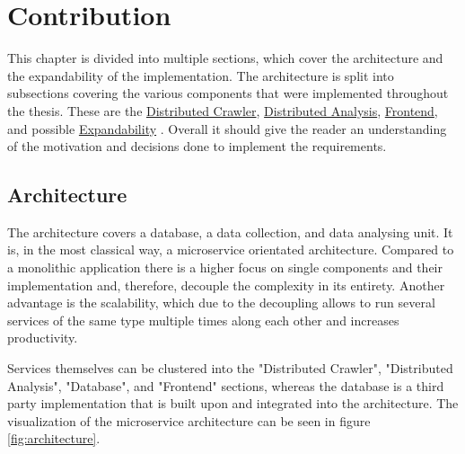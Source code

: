 \chapter{Contribution}

This chapter is divided into multiple sections, which cover the architecture and the expandability of the implementation. The architecture is split into subsections covering the various components that were implemented throughout the thesis. These are the \hyperref[sec:crawler]{Distributed Crawler}, \hyperref[sec:distributed_analysis]{Distributed Analysis}, \hyperref[sec:fronted]{Frontend}, and possible \hyperref[sec:expandability]{Expandability} . Overall it should give the reader an understanding of the motivation and decisions done to implement the requirements.


\section{Architecture}
\label{sec:architecture}

The architecture covers a database, a data collection, and data analysing unit. It is, in the most classical way, a microservice orientated architecture. Compared to a monolithic application there is a higher focus on single components and their implementation and, therefore, decouple the complexity in its entirety. Another advantage is the scalability, which due to the decoupling allows to run several services of the same type multiple times along each other and increases productivity.

Services themselves can be clustered into the "Distributed Crawler", "Distributed Analysis", "Database", and "Frontend" sections, whereas the database is a third party implementation that is built upon and integrated into the architecture. The visualization of the microservice architecture can be seen in figure \ref{fig:architecture}.

